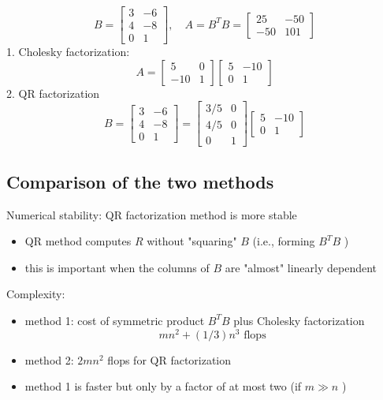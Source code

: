\begin{example}
    $$
B=\left[\begin{array}{rr}
3 & -6 \\
4 & -8 \\
0 & 1
\end{array}\right], \quad A=B^{T} B=\left[\begin{array}{rr}
25 & -50 \\
-50 & 101
\end{array}\right]
$$
1. Cholesky factorization:
$$
A=\left[\begin{array}{rr}
5 & 0 \\
-10 & 1
\end{array}\right]\left[\begin{array}{rr}
5 & -10 \\
0 & 1
\end{array}\right]
$$
2. QR factorization
$$
B=\left[\begin{array}{rr}
3 & -6 \\
4 & -8 \\
0 & 1
\end{array}\right]=\left[\begin{array}{rr}
3 / 5 & 0 \\
4 / 5 & 0 \\
0 & 1
\end{array}\right]\left[\begin{array}{rr}
5 & -10 \\
0 & 1
\end{array}\right]
$$
\end{example}

\subsection{Comparison of the two methods}

Numerical stability: QR factorization method is more stable

\begin{itemize}
    \item QR method computes $ R $ without "squaring" $ B $ (i.e., forming $ B^{T} B $ )
    \item this is important when the columns of $ B $ are "almost" linearly dependent
\end{itemize}

Complexity:
\begin{itemize}
    \item method 1: cost of symmetric product $ B^{T} B $ plus Cholesky factorization
$$
m n^{2}+(1 / 3) n^{3} \text { flops }
$$
    \item method 2: $ 2 m n^{2} $ flops for QR factorization
    \item method 1 is faster but only by a factor of at most two (if $ m \gg n $ )
\end{itemize}


